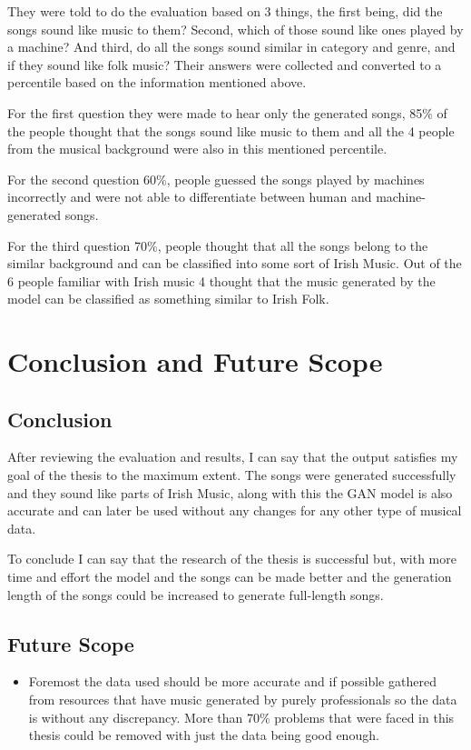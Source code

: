 \documentclass[oneside,12pt]{Classes/RoboticsLaTeX}
\begin{document}
They were told to do the evaluation based on 3 things, the first being, did the songs sound like music to them? Second, which of those sound like ones played by a machine? And third, do all the songs sound similar in category and genre, and if they sound like folk music? Their answers were collected and converted to a percentile based on the information mentioned above. 

For the first question they were made to hear only the generated songs, 85\% of the people thought that the songs sound like music to them and all the 4 people from the musical background were also in this mentioned percentile.

For the second question 60\%, people guessed the songs played by machines incorrectly and were not able to differentiate between human and machine-generated songs.

For the third question 70\%, people thought that all the songs belong to the similar background and can be classified into some sort of Irish Music. Out of the 6 people familiar with Irish music 4 thought that the music generated by the model can be classified as something similar to Irish Folk.

\chapter{Conclusion and Future Scope}
\label{chap:scopeandcon}

\section{Conclusion}

After reviewing the evaluation and results, I can say that the output satisfies my goal of the thesis to the maximum extent. The songs were generated successfully and they sound like parts of Irish Music, along with this the GAN model is also accurate and can later be used without any changes for any other type of musical data.

To conclude I can say that the research of the thesis is successful but, with more time and effort the model and the songs can be made better and the generation length of the songs could be increased to generate full-length songs.
\section{Future Scope}

\begin{itemize}
  \item Foremost the data used should be more accurate and if possible gathered from resources that have music generated by purely professionals so the data is without any discrepancy. More than 70\% problems that were faced in this thesis could be removed with just the data being good enough.
\end{itemize}
\end{document}
